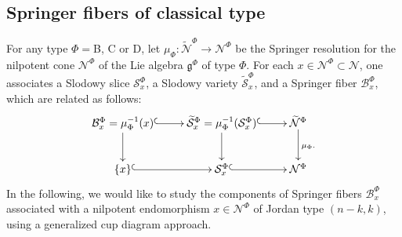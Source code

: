 \documentclass[11pt,reqno]{amsart}
\numberwithin{equation}{section}
\theoremstyle{definition}
\newcommand{\cB}{\mathcal{B}}
\newcommand{\cN}{\mathcal{N}}
\newcommand{\cS}{\mathcal{S}}
\newcommand{\fg}{\mathfrak{g}}
\newcommand{\inv}{^{-1}}
\newcommand{\tcN}{\widetilde{\cN}}
\newcommand{\tcS}{\widetilde{\cS}}
\begin{document}
\subsection{Springer fibers of classical type}
For any type $\Phi = {}$B, C or D, let $\mu_\Phi: \tcN^{\Phi} \to \cN^\Phi$ be the Springer resolution for the nilpotent cone $\cN^\Phi$ of the Lie algebra $\fg^\Phi$ of type $\Phi$. 
For each $x \in \cN^\Phi \subset \cN$, one associates a Slodowy slice $\cS^\Phi_x$, a Slodowy variety $\tcS^\Phi_x$, and a Springer fiber $\cB^\Phi_x$, which are related as follows:
\[ 
\xymatrix@-1.25pc{
\cB^\Phi_x = \mu_\Phi\inv(x) \ar@{^{(}->}[rr]  \ar[dd] & &  
\tcS^\Phi_x = \mu_\Phi\inv(\cS^\Phi_x)  \ar@{^{(}->}[rr] \ar[dd] & &  
\tcN^\Phi  \ar[dd]^{\mu_{\Phi}.}\\ 
& &    & &  \\ 
\{ x\} \ar@{^{(}->}[rr] & & \cS^\Phi_x \ar@{^{(}->}[rr] & & 
\cN^\Phi \\ 
}
\] 
In the following, we would like to study the components of Springer fibers $\cB^\Phi_{x}$ associated with a nilpotent endomorphism $x \in \cN^\Phi$ of Jordan type $(n-k,k)$, using a generalized cup diagram approach.
\end{document}
